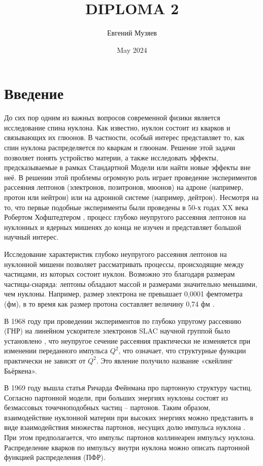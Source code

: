 \documentclass{extarticle}
\title{DIPLOMA 2}
\author{Евгений Музяев}
\date{May 2024}
\begin{document}



\newpage
\tableofcontents
\setcounter{page}{4}
\thispagestyle{headings}
\newpage


\section*{Введение}

До сих пор одним из важных вопросов современной физики является исследование спина нуклона. Как известно, нуклон состоит из кварков и связывающих их глюонов. В частности, особый интерес представляет то, как спин нуклона распределяется по кваркам и глюонам. Решение этой задачи позволяет понять устройство материи, а также исследовать эффекты, предсказываемые в рамках Стандартной Модели или найти новые эффекты вне неё. В решении этой проблемы огромную роль играет проведение экспериментов рассеяния лептонов (электронов, позитронов, мюонов) на адроне (например, протон или нейтрон) или на адронной системе (например, дейтрон). Несмотря на то, что первые подобные эксперименты были проведены в 50-х годах XX века Робертом Хофштедтером \cite{Hofstadter}, процесс глубоко неупругого рассеяния лептонов на нуклонных и ядерных мишенях до конца не изучен и представляет большой научный интерес.


Исследование характеристик глубоко неупругого рассеяния лептонов на нуклонной мишени позволяет рассматривать процессы, происходящие между частицами, из которых состоит нуклон. Возможно это благодаря размерам частицы-снаряда: лептоны обладают массой и размерами значительно меньшими, чем нуклоны. Например, размер электрона не превышает 0,0001 фемтометра (фм), в то время как размер протона составляет величину 0,74 фм \cite{Hofstadter}.


В 1968 году при проведении экспериментов по глубоко упругому рассеянию (ГНР) на линейном ускорителе электронов SLAC научной группой было установлено \cite{SLAC}, что неупругое сечение рассеяния практически не изменяется при изменении переданного импульса $Q^2$, что означает, что структурные функции практически не зависят от $Q^2$. Это явление получило название «скейлинг Бьёркена».


В 1969 году вышла статья Ричарда Фейнмана про партонную структуру частиц. Согласно партонной модели, при больших энергиях нуклоны состоят из безмассовых точечноподобных частиц – партонов. Таким образом, взаимодействие нуклонной материи при высоких энергиях можно представить в виде взаимодействия множества партонов, несущих долю импульса нуклона \cite{Feynman}. При этом предполагается, что импульс партонов коллинеарен импульсу нуклона. Распределение кварков по импульсу внутри нуклона можно описать партонной функцией распределения (ПФР).
\end{document}
